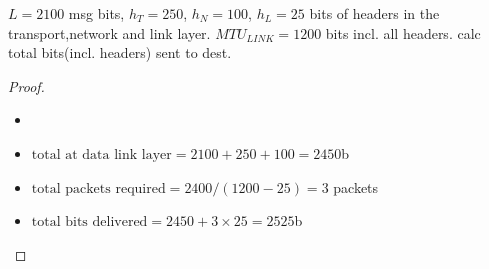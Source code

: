 \documentclass[./answersheet.tex]{subfiles}
\begin{document}
 \begin{wts}
   $L=2100$ msg bits, $h_T=250$, $h_N=100$, $h_L=25$ bits of headers in the transport,network and link layer. $MTU_{LINK}=1200$ bits incl. all headers. calc total bits(incl. headers) sent to dest.
\end{wts}
\begin{proof}
    \begin{itemize}[noitemsep]
    \item[]
    \item $\text{total at data link layer} = 2100+250+100=2450$b
    \item $\text{total packets required} = 2400/(1200-25) = 3$ packets
    \item $\text{total bits delivered} = 2450 + 3\times 25=2525$b 
    \end{itemize}
\end{proof}
\end{document}
